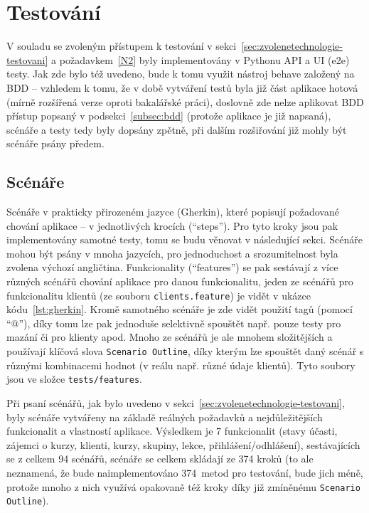 \chapter{Testování}\label{chap:testovani}

V souladu se zvoleným přístupem k testování v sekci~\ref{sec:zvolenetechnologie-testovani} a požadavkem~\ref{N2} byly implementovány v Pythonu API a UI (e2e) testy. Jak zde bylo též uvedeno, bude k tomu využit nástroj behave založený na BDD -- vzhledem k tomu, že v době vytváření testů byla již část aplikace hotová (mírně rozšířená verze oproti bakalářské práci), doslovně zde nelze aplikovat BDD přístup popsaný v podsekci~\ref{subsec:bdd} (protože aplikace je již napsaná), scénáře a testy tedy byly dopsány zpětně, při dalším rozšiřování již mohly být scénáře psány předem.

\section{Scénáře}

Scénáře v prakticky přirozeném jazyce (Gherkin), které popisují požadované chování aplikace -- v jednotlivých krocích (\enquote{steps}). Pro tyto kroky jsou pak implementovány samotné testy, tomu se budu věnovat v následující sekci. Scénáře mohou být psány v mnoha jazycích, pro jednoduchost a srozumitelnost byla zvolena výchozí angličtina. Funkcionality (\enquote{features}) se pak sestávají z více různých scénářů chování aplikace pro danou funkcionalitu, jeden ze scénářů pro funkcionalitu klientů (ze souboru \verb|clients.feature|) je vidět v ukázce kódu~\ref{lst:gherkin}. Kromě samotného scénáře je zde vidět použití tagů (pomocí \enquote{@}), díky tomu lze pak jednoduše selektivně spouštět např. pouze testy pro mazání či pro klienty apod. Mnoho ze scénářů je ale mnohem složitějších a používají klíčová slova \verb|Scenario Outline|, díky kterým lze spouštět daný scénář s různými kombinacemi hodnot (v reálu např. různé údaje klientů). Tyto soubory jsou ve složce \verb|tests/features|.

Při psaní scénářů, jak bylo uvedeno v sekci~\ref{sec:zvolenetechnologie-testovani}, byly scénáře vytvářeny na základě reálných požadavků a nejdůležitějších funkcionalit a vlastností aplikace. Výsledkem je 7 funkcionalit (stavy účasti, zájemci o kurzy, klienti, kurzy, skupiny, lekce, přihlášení/odhlášení), sestávajících se z celkem 94 scénářů, scénáře se celkem skládají ze 374 kroků (to ale neznamená, že bude naimplementováno 374~metod pro testování, bude jich méně, protože mnoho z nich využívá opakovaně též kroky díky již zmíněnému \verb|Scenario Outline|).

